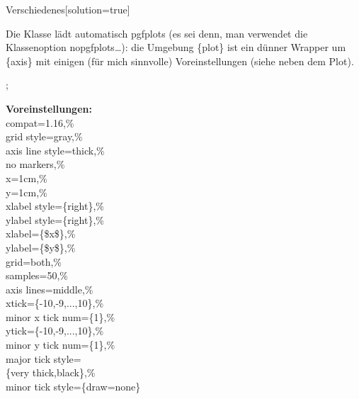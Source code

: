 \documentclass[hyperworksheet,pgfplots]{drcschool}
\newcommand*{\pkg}[1]{\textup{\ttfamily#1}}                                %
\newcommand*{\opt}[1]{\textup{\ttfamily#1}}                                %
\newcommand*{\env}[1]{\textup{\ttfamily\{#1\}}}                            %
\newcommand*{\param}[1]{\mbox{\normalfont$\langle$\textit{#1}$\rangle$}}   %
\begin{document}
\begin{worksheet}{Verschiedenes}[solution=true]

\exercise[Plots]
Die Klasse lädt automatisch \pkg{pgfplots} (es sei denn, man verwendet die
Klassenoption \opt{nopgfplots}\ldots): die Umgebung \env{plot} ist
ein dünner Wrapper um \env{axis} mit einigen (für mich sinnvolle) Voreinstellungen
(siehe neben dem Plot).

\noindent
\begin{plot}[xmin=-5,xmax=5,ymin=-3.7,ymax=4.5]
 ;
\end{plot}\hfill
\parbox[b]{.3\linewidth}{%
   \footnotesize
   \textbf{Voreinstellungen:}\\
   \ttfamily
   compat=1.16,\%\\
   grid style=gray,\%\\
   axis line style=thick,\%\\
   no markers,\%\\
   x=1cm,\%\\
   y=1cm,\%\\
   xlabel style=\{right\},\%\\
   ylabel style=\{right\},\%\\
   xlabel=\{\$x\$\},\%\\
   ylabel=\{\$y\$\},\%\\
   grid=both,\%\\
   samples=50,\%\\
   axis lines=middle,\%\\
   xtick=\{-10,-9,...,10\},\%\\
   minor x tick num=\{1\},\%\\
   ytick=\{-10,-9,...,10\},\%\\
   minor y tick num=\{1\},\%\\
   major tick style=\\\null\qquad\{very thick,black\},\%\\
   minor tick style=\{draw=none\}
}


\end{worksheet}
\end{document}
